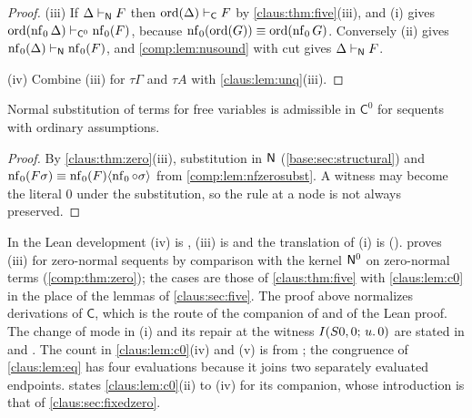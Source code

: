 \begin{proof}
(iii) If $\Delta\vdash_{\mathsf{N}}F$ then
$\operatorname{ord}(\Delta)\vdash_{\mathsf{C}}F$ by
\cref{claus:thm:five}(iii), and (i) gives
$\operatorname{ord}(\operatorname{nf}_0\Delta)\vdash_{\mathsf{C}^{0}}\operatorname{nf}_0(F)$, because
$\operatorname{nf}_0(\operatorname{ord}(G))\equiv\operatorname{ord}(\operatorname{nf}_0 G)$. Conversely
(ii) gives $\operatorname{nf}_0(\Delta)\vdash_{\mathsf{N}}\operatorname{nf}_0(F)$, and \cref{comp:lem:nusound}
with cut gives $\Delta\vdash_{\mathsf{N}}F$.

(iv) Combine (iii) for $\tau\Gamma$ and $\tau A$ with
\cref{claus:lem:unq}(iii).
\end{proof}

\begin{corollary}[Substitution]
\label{claus:cor:zerosubst}
Normal substitution of terms for free variables is admissible in
$\mathsf{C}^{0}$ for sequents with ordinary assumptions.
\end{corollary}
\begin{proof}
By \cref{claus:thm:zero}(iii), substitution in $\mathsf{N}$
(\cref{base:sec:structural}) and
$\operatorname{nf}_0(F\sigma)\equiv\operatorname{nf}_0(F)\langle\operatorname{nf}_0\circ\sigma\rangle$ from
\cref{comp:lem:nfzerosubst}. A witness may become the literal $0$ under the
substitution, so the rule at a node is not always preserved.
\end{proof}

\begin{remark}
\label{claus:rem:zeropkgs}
In the Lean development (iv) is , (iii) is
 and the translation of (i) is
 (). 
proves (iii) for zero-normal sequents by comparison with the kernel
$\mathsf{N}^{0}$ on zero-normal terms (\cref{comp:thm:zero}); the cases are those
of \cref{claus:thm:five} with
\cref{claus:lem:c0} in the place of the lemmas of \cref{claus:sec:five}.
The proof above normalizes derivations of $\mathsf{C}$, which is the route
of the companion of  and of the Lean proof.
The change of mode in (i) and its repair at the witness
$I(S 0,0;\,u.\,0)$ are stated in  and
. The count in
\cref{claus:lem:c0}(iv) and (v) is from ;
the congruence of \cref{claus:lem:eq} has four evaluations because it
joins two separately evaluated endpoints.  states
\cref{claus:lem:c0}(ii) to (iv) for its companion, whose introduction is
that of \cref{claus:sec:fixedzero}.
\end{remark}

